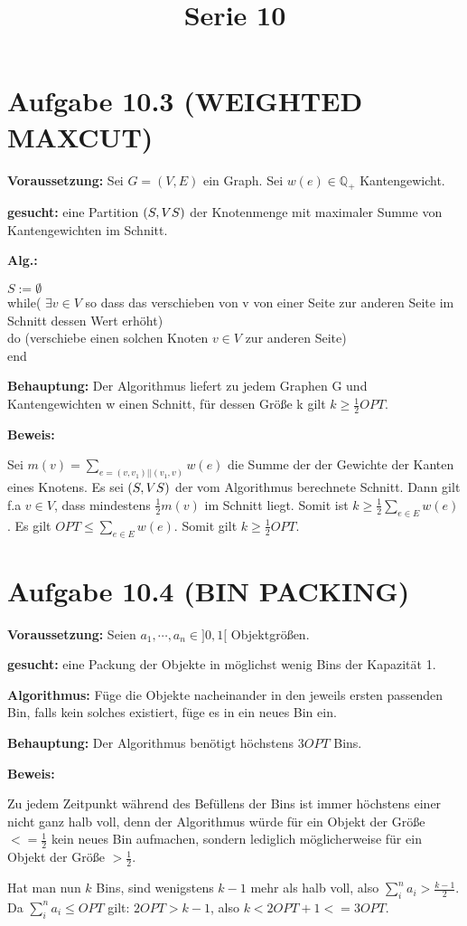  
\title{Serie 10}

 

  \section*{Aufgabe 10.3 (WEIGHTED MAXCUT)}
  \textbf{Voraussetzung: } Sei $G = (V,E)$ ein Graph. Sei $w(e) \in \mathbb{Q}_+$ Kantengewicht.
  
  \noindent
  \textbf{gesucht: } eine Partition $(S, V\\S)$ der Knotenmenge mit maximaler Summe von Kantengewichten im Schnitt.
  
  \noindent
  \textbf{Alg.: }
  
  $S := \emptyset$\\
  while( $\exists v \in V$ so dass das verschieben von v von einer Seite zur anderen Seite im Schnitt dessen Wert erhöht)\\
  do (verschiebe einen solchen Knoten $v \in V$ zur anderen Seite)\\
  end

  \noindent
  \textbf{Behauptung: } Der Algorithmus liefert zu jedem Graphen G und Kantengewichten w einen Schnitt, für dessen Größe k gilt $k \geq \frac{1}{2} OPT$.
  
  \noindent
  \textbf{Beweis: }
  
  Sei $m(v) = \sum_{ e = (v, v_1) || (v_1, v)} w(e)$ die Summe der der Gewichte der Kanten eines Knotens.
  Es sei $(S, V\\S)$ der vom Algorithmus berechnete Schnitt. Dann gilt f.a $v \in V$, dass mindestens $\frac{1}{2} m(v)$ im Schnitt liegt. Somit ist $k \geq \frac{1}{2} \sum_{e \in E} w(e)$. Es gilt $OPT \leq \sum_{e \in E} w(e)$. Somit gilt $k \geq \frac{1}{2} OPT$.
  
  \section*{Aufgabe 10.4 (BIN PACKING)}
  \textbf{Voraussetzung: } Seien $a_1, \cdots , a_n \in ]0,1[$ Objektgrößen.
  
  \noindent
  \textbf{gesucht: } eine Packung der Objekte in möglichst wenig Bins der Kapazität 1.
  
  \noindent
  \textbf{Algorithmus: } 
  Füge die Objekte nacheinander in den jeweils ersten passenden Bin, falls kein solches existiert, füge es in ein neues Bin ein.
  
  \noindent
  \textbf{Behauptung: } Der Algorithmus benötigt höchstens $3OPT$ Bins. 
  
  \noindent
  \textbf{Beweis: }
    
  Zu jedem Zeitpunkt während des Befüllens der Bins ist immer höchstens einer nicht ganz halb voll, denn der Algorithmus würde für ein Objekt der Größe $<= \frac{1}{2}$ kein neues Bin aufmachen, sondern lediglich möglicherweise für ein Objekt der Größe $> \frac{1}{2}$. 
  
  Hat man nun $k$ Bins, sind wenigstens $k - 1$ mehr als halb voll, also $\sum_{i}^{n} a_i > \frac{k - 1}{2}$. Da $\sum_{i}^{n} a_i \leq OPT$ gilt: $2OPT > k-1$, also $k < 2OPT + 1 <= 3OPT$.
